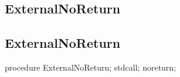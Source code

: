 \documentclass{report}
\newif\ifpdf
\begin{document}
\subsection*{\large{\textbf{ExternalNoReturn}}\normalsize\hspace{1ex}\hrulefill}
\else
\subsection*{ExternalNoReturn}
\fi
\label{ok_noreturn-ExternalNoReturn}
\begin{list}{}{
\setlength{\itemindent}{0cm}
\setlength{\listparindent}{0cm}
\setlength{\leftmargin}{\evensidemargin}
\addtolength{\leftmargin}{\tmplength}
\settowidth{\labelsep}{X}
\addtolength{\leftmargin}{\labelsep}
\setlength{\labelwidth}{\tmplength}
}
\item[\textbf{Declaration}\hfill]
\ifpdf
\begin{flushleft}
\fi
\begin{ttfamily}
procedure ExternalNoReturn; stdcall; noreturn;\end{ttfamily}

\ifpdf
\end{flushleft}
\fi

\end{list}
\end{document}
